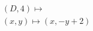 \documentclass[preview]{standalone}
\begin{document}
\begin{align*}
&(D,4) \mapsto \\& (x,y) \mapsto (x, -y + 2)
\end{align*}
\end{document}
